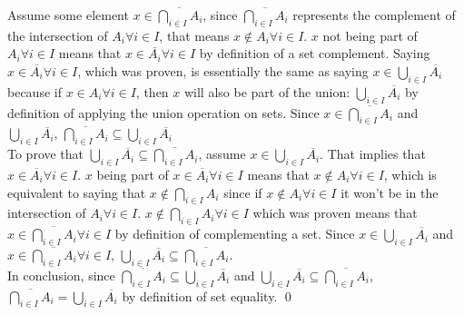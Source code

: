 \documentclass{article}
\begin{document}
\begin{enumerate}
  \newline
  Assume some element $x \in \overline{\bigcap_{i \in I} A_i}$, since $\overline{\bigcap_{i \in I} A_i}$ represents the complement of the intersection of $A_i \forall i \in I$, that means $x \notin A_i \forall i \in I$. $x$ not being part of $A_i \forall i \in I$ means that $x \in \overline{A_i} \forall i \in I$ by definition of a set complement. Saying  $x \in \overline{A_i} \forall i \in I$, which was proven, is essentially the same as saying $x \in \bigcup_{i\in I} \overline{A_i}$ because if $x \in A_i \forall i \in I$, then $x$ will also be part of the union: $\bigcup_{i\in I} \overline{A_i}$ by definition of applying the union operation on sets. Since $x \in \overline{\bigcap_{i \in I} A_i}$ and $\bigcup_{i\in I} \overline{A_i}$, $\overline{\bigcap_{i \in I} A_i} \subseteq \bigcup_{i\in I} \overline{A_i}$ \\
  \newline
  To prove that $\bigcup_{i\in I} \overline{A_i} \subseteq \overline{\bigcap_{i \in I} A_i}$, assume $x \in \bigcup_{i\in I} \overline{A_i}$. That implies that $x \in \overline{A_i} \forall i \in I$. $x$ being part of $x \in \overline{A_i} \forall i \in I$ means that $x \notin A_i \forall i \in I$, which is equivalent to saying that $x \notin \bigcap_{i \in I} A_i$ since if $x \notin A_i \forall i \in I$ it won't be in the intersection of $ A_i \forall i \in I$. $x \notin \bigcap_{i \in I} A_i \forall i \in I$ which was proven means that $x \in \overline{\bigcap_{i \in I} A_i} \forall i \in I$ by definition of complementing a set. Since $x \in \bigcup_{i\in I} \overline{A_i}$ and $x \in \overline{\bigcap_{i \in I} A_i} \forall i \in I$, $\bigcup_{i\in I} \overline{A_i} \subseteq \overline{\bigcap_{i \in I} A_i}$. \\
  \newline
  In conclusion, since $\overline{\bigcap_{i \in I} A_i} \subseteq \bigcup_{i\in I} \overline{A_i}$ and $\bigcup_{i\in I} \overline{A_i} \subseteq \overline{\bigcap_{i \in I} A_i}$, $\overline{\bigcap_{i \in I} A_i} = \bigcup_{i\in I} \overline{A_i}$ by definition of set equality. \qed
\end{enumerate}
\end{document}
